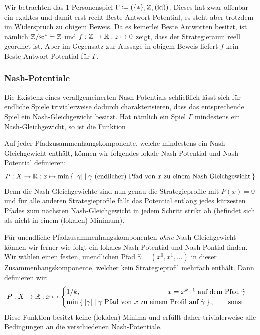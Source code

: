 \begin{bsp}
	Wir betrachten das $1$-Personenspiel $\Gamma \coloneqq (\{\ast\}, \mathbb{Z}, (\mathrm{id}))$. Dieses hat zwar offenbar ein exaktes und damit erst recht Beste-Antwort-Potential, es steht aber trotzdem im Widerspruch zu obigem Beweis. Da es keinerlei Beste Antworten besitzt, ist nämlich $\mathbb{Z}/{\approx^\ast} = \mathbb{Z}$ und $f: \mathbb{Z} \to \mathbb{R}: z \mapsto 0$ zeigt, dass der Strategieraum reell geordnet ist. Aber im Gegensatz zur Aussage in obigem Beweis liefert $f$ kein Beste-Antwort-Potential für $\Gamma$.
\end{bsp}


\subsubsection{Nash-Potentiale}

Die Existenz eines verallgemeinerten Nash-Potentials schließlich lässt sich für endliche Spiele trivialerweise dadurch charakterisieren, dass das entsprechende Spiel ein Nash-Gleichgewicht besitzt. Hat nämlich ein Spiel $\Gamma$ mindestens ein Nash-Gleichgewicht, so ist die Funktion

Auf jeder Pfadzusammenhangskomponente, welche mindestens ein Nash-Gleichgewicht enthält, können wir folgendes lokale Nash-Potential und Nash-Potential definieren:
	\[P: X \to \mathbb{R}: x \mapsto \min\Set{\left|\gamma\right| | \gamma \text{ (endlicher) Pfad von } x \text{ zu einem Nash-Gleichgewicht}} \]
Denn die Nash-Gleichgewichte sind nun genau die Strategieprofile mit $P(x) = 0$ und für alle anderen Strategieprofile fällt das Potential entlang jedes kürzesten Pfades zum nächsten Nash-Gleichgewicht in jedem Schritt strikt ab (befindet sich als nicht in einem (lokalen) Minimum).

Für unendliche Pfadzusammenhangskomponenten \emph{ohne} Nash-Gleichgewicht können wir ferner wie folgt ein lokales Nash-Potential und Nash-Pontial finden. Wir wählen einen festen, unendlichen Pfad $\hat{\gamma} = (x^0, x^1, \dots)$ in dieser Zusammenhangskomponente, welcher kein Strategieprofil mehrfach enthält. Dann definieren wir:
	\[P: X \to \IR: x \mapsto \begin{cases}
		1/k, \hspace{12.5em} x = x^{k-1} \text{ auf dem Pfad } \hat{\gamma} \\
		\min\Set{\abs{\gamma} | \gamma \text{ Pfad von $x$ zu einem Profil auf $\hat{\gamma}$}}, \qquad\text{sonst}
	\end{cases}\]
Diese Funktion besitzt keine (lokalen) Minima und erfüllt daher trivialerweise alle Bedingungen an die verschiedenen Nash-Potentiale.

